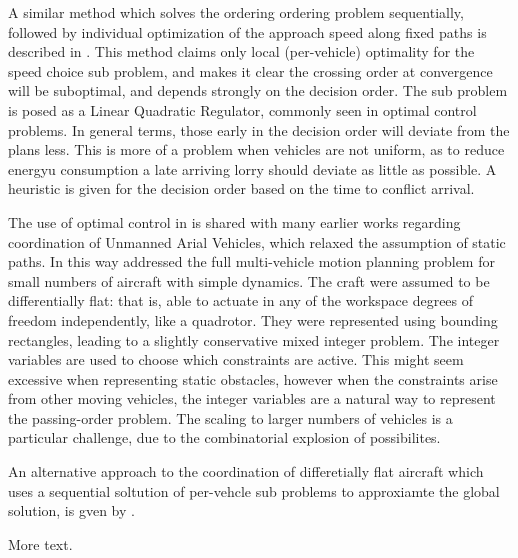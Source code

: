 \documentclass[11pt]{article} %
\begin{document}
A similar method which solves the ordering ordering problem sequentially, followed by individual optimization of the approach speed along fixed paths is described in \cite{DeCampos2017}. This method claims only local (per-vehicle) optimality for the speed choice sub problem, and makes it clear the crossing order at convergence will be suboptimal, and depends strongly on the decision order. The sub problem is posed as a Linear Quadratic Regulator, commonly seen in optimal control problems. In general terms, those early in the decision order will deviate from the plans less. This is more of a problem when vehicles are not uniform, as to reduce energyu consumption a late arriving lorry should deviate as little as possible. A heuristic is given for the decision order based on the time to conflict arrival.

The use of optimal control in \cite{DeCampos2017} is shared with many earlier works regarding coordination of Unmanned Arial Vehicles, which relaxed the assumption of static paths. In this way \cite{Schouwenaars2004} addressed the full multi-vehicle motion planning problem for small numbers of aircraft with simple dynamics. The craft were assumed to be differentially flat: that is, able to actuate in any of the workspace degrees of freedom independently, like a quadrotor. They were represented using bounding rectangles, leading to a slightly conservative mixed integer problem. The integer variables are used to choose which constraints are active. This might seem excessive when representing static obstacles, however when the constraints arise from other moving vehicles, the integer variables are a natural way to represent the passing-order problem. The scaling to larger numbers of vehicles is a particular challenge, due to the combinatorial explosion of possibilites.

An alternative approach to the coordination of differetially flat aircraft which uses a sequential soltution of per-vehcle sub problems to approxiamte the global solution, is gven by \cite{Keviczky2008}. 
 

More text.


\end{document}
